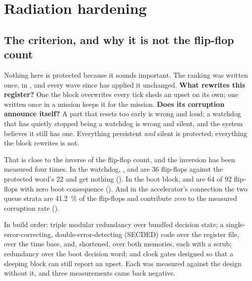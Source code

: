 \chapter{Radiation hardening}
\label{ch:harden}

\section{The criterion, and why it is not the flip-flop count}
\label{sec:harden-criterion}

Nothing here is protected because it sounds important. The ranking was
written once, in , and every wave since has
applied it unchanged. \textbf{What rewrites this register?} One the
block overwrites every tick sheds an upset on its own; one written once
in a mission keeps it for the mission. \textbf{Does its corruption
announce itself?} A part that resets too early is wrong and loud; a
watchdog that has quietly stopped being a watchdog is wrong and silent,
and the system believes it still has one. Everything persistent
\emph{and} silent is protected; everything the block rewrites is not.

That is close to the inverse of the flip-flop count, and the inversion
has been measured four times. In the watchdog, ,
 and  are 36 flip-flops against the protected
word's 22 and get nothing (). In the boot block,
 and  are 64 of 92 flip-flops with zero boot
consequence (). And in the accelerator's connection the
two queue strata are \SI{41.2}{\percent} of the flip-flops and
contribute \emph{zero} to the measured corruption rate
().

In build order: triple modular redundancy over bundled decision state;
a single-error-correcting, double-error-detecting (SECDED) code over the
register file, over the time base, and, shortened, over both memories,
each with a scrub; redundancy over the boot decision word; and clock
gates designed so that a sleeping block can still report an upset. Each
was measured against the design without it, and three measurements came
back negative.

